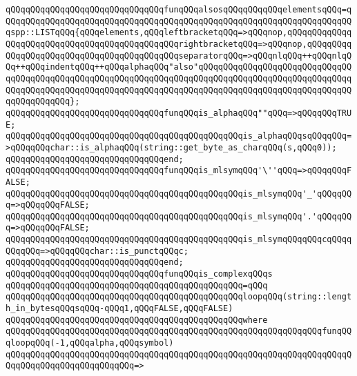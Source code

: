 \verb|qQQqqQQqqQQqqQQqqQQqqQQqqQQqqQQqfunqQQqalsosqQQqqQQqqQQqelementsqQQq=qQQqqQQqqQQqqQQqqQQqqQQqqQQqqQQqqQQqqQQqqQQqqQQqqQQqqQQqqQQqqQQqqQQqqQQqspp::LISTqQQq{qQQqelements,qQQqleftbracketqQQq=>qQQqnop,qQQqqQQqqQQqqQQqqQQqqQQqqQQqqQQqqQQqqQQqqQQqqQQqrightbracketqQQq=>qQQqnop,qQQqqQQqqQQqqQQqqQQqqQQqqQQqqQQqqQQqqQQqqQQqseparatorqQQq=>qQQqnlqQQq++qQQqnlqQQq++qQQqindentqQQq++qQQqalphaqQQq"also"qQQqqQQqqQQqqQQqqQQqqQQqqQQqqQQqqQQqqQQqqQQqqQQqqQQqqQQqqQQqqQQqqQQqqQQqqQQqqQQqqQQqqQQqqQQqqQQqqQQqqQQqqQQqqQQqqQQqqQQqqQQqqQQqqQQqqQQqqQQqqQQqqQQqqQQqqQQqqQQqqQQqqQQqqQQqqQQqqQQqqQQq};|\newline
\newline
\verb|qQQqqQQqqQQqqQQqqQQqqQQqqQQqqQQqfunqQQqis_alphaqQQq""qQQq=>qQQqqQQqTRUE;|\newline
\verb|qQQqqQQqqQQqqQQqqQQqqQQqqQQqqQQqqQQqqQQqqQQqqQQqis_alphaqQQqsqQQqqQQq=>qQQqqQQqchar::is_alphaqQQq(string::get_byte_as_charqQQq(s,qQQq0));|\newline
\verb|qQQqqQQqqQQqqQQqqQQqqQQqqQQqqQQqend;|\newline
\newline
\verb|qQQqqQQqqQQqqQQqqQQqqQQqqQQqqQQqfunqQQqis_mlsymqQQq'\''qQQq=>qQQqqQQqFALSE;|\newline
\verb|qQQqqQQqqQQqqQQqqQQqqQQqqQQqqQQqqQQqqQQqqQQqqQQqis_mlsymqQQq'_'qQQqqQQq=>qQQqqQQqFALSE;|\newline
\verb|qQQqqQQqqQQqqQQqqQQqqQQqqQQqqQQqqQQqqQQqqQQqqQQqis_mlsymqQQq'.'qQQqqQQq=>qQQqqQQqFALSE;|\newline
\verb|qQQqqQQqqQQqqQQqqQQqqQQqqQQqqQQqqQQqqQQqqQQqqQQqis_mlsymqQQqqQQqcqQQqqQQqqQQq=>qQQqqQQqchar::is_punctqQQqc;|\newline
\verb|qQQqqQQqqQQqqQQqqQQqqQQqqQQqqQQqend;|\newline
\newline
\verb|qQQqqQQqqQQqqQQqqQQqqQQqqQQqqQQqfunqQQqis_complexqQQqs|\newline
\verb|qQQqqQQqqQQqqQQqqQQqqQQqqQQqqQQqqQQqqQQqqQQqqQQq=qQQq|\newline
\verb|qQQqqQQqqQQqqQQqqQQqqQQqqQQqqQQqqQQqqQQqqQQqqQQqloopqQQq(string::length_in_bytesqQQqsqQQq-qQQq1,qQQqFALSE,qQQqFALSE)|\newline
\verb|qQQqqQQqqQQqqQQqqQQqqQQqqQQqqQQqqQQqqQQqqQQqqQQqwhere|\newline
\verb|qQQqqQQqqQQqqQQqqQQqqQQqqQQqqQQqqQQqqQQqqQQqqQQqqQQqqQQqqQQqqQQqfunqQQqloopqQQq(-1,qQQqalpha,qQQqsymbol)|\newline
\verb|qQQqqQQqqQQqqQQqqQQqqQQqqQQqqQQqqQQqqQQqqQQqqQQqqQQqqQQqqQQqqQQqqQQqqQQqqQQqqQQqqQQqqQQqqQQqqQQq=>|\newline
